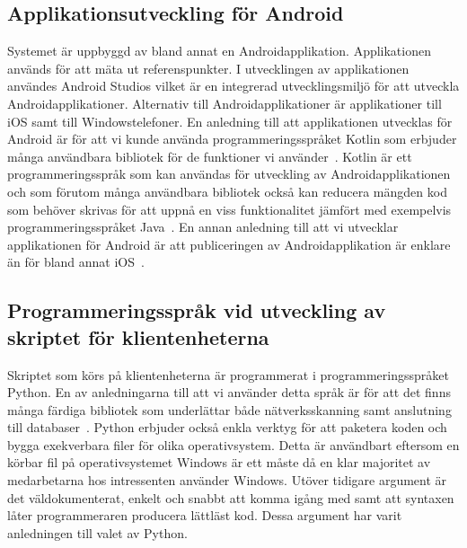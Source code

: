 \documentclass[a4paper,12pt]{article}
\begin{document}
 \subsection{Applikationsutveckling för Android}
 Systemet är uppbyggd av bland annat en Androidapplikation. Applikationen används för att mäta ut referenspunkter. I utvecklingen av applikationen användes Android Studios vilket är en integrerad utvecklingsmiljö för att utveckla Androidapplikationer. Alternativ till Androidapplikationer är applikationer till iOS samt till Windowstelefoner. En anledning till att applikationen utvecklas för Android är för att vi kunde använda programmeringsspråket Kotlin som erbjuder många användbara bibliotek för de funktioner vi använder~\cite{kotlin}. Kotlin är ett programmeringsspråk som kan användas för utveckling av Androidapplikationen och som
 förutom många användbara bibliotek också kan reducera mängden kod som behöver skrivas för att uppnå en viss funktionalitet jämfört med exempelvis programmeringsspråket Java~\cite{kotlin}.
 En annan anledning till att vi utvecklar applikationen för Android är att publiceringen av Androidapplikation är enklare än för bland annat iOS~\cite{submitIphone,android}.

 \subsection{Programmeringsspråk vid utveckling av skriptet för klientenheterna}\label{pythonskript}
 Skriptet som körs på klientenheterna är programmerat i programmeringsspråket Python. En av anledningarna till att vi använder detta språk är för att det finns många färdiga bibliotek som underlättar både nätverksskanning samt anslutning till databaser~\cite{python}. Python erbjuder också enkla verktyg för att paketera koden och bygga exekverbara filer för olika operativsystem. Detta är användbart eftersom en körbar fil på operativsystemet Windows är ett måste då en klar majoritet av medarbetarna hos intressenten använder Windows. Utöver tidigare argument är det väldokumenterat, enkelt och snabbt att komma igång med samt att syntaxen låter programmeraren producera lättläst kod. Dessa argument har varit anledningen till valet av Python.
\end{document}
